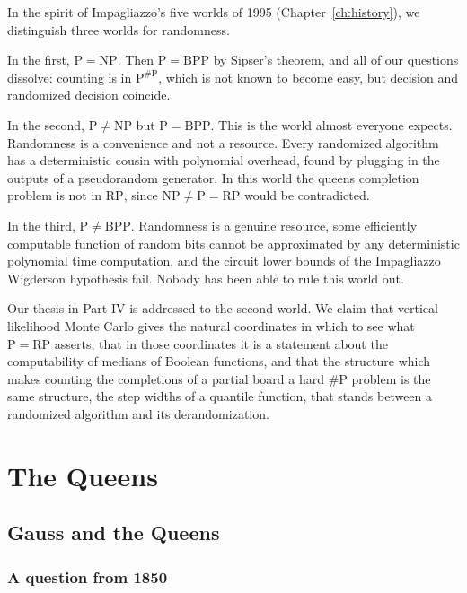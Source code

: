 \documentclass[11pt,twoside,openany]{book}
\theoremstyle{plain}
\theoremstyle{definition}
\theoremstyle{remark}
\newcommand{\RP}{\mathrm{RP}}
\newcommand{\BPP}{\mathrm{BPP}}
\newcommand{\NP}{\mathrm{NP}}
\newcommand{\Pc}{\mathrm{P}}
\newcommand{\sharpP}{\#\mathrm{P}}
\begin{document}
In the spirit of Impagliazzo's five worlds of 1995 (Chapter~\ref{ch:history}), we distinguish three worlds for randomness.

In the first, $\Pc = \NP$. Then $\Pc = \BPP$ by Sipser's theorem, and all of our questions dissolve: counting is in $\Pc^{\sharpP}$, which is not known to become easy, but decision and randomized decision coincide.

In the second, $\Pc \neq \NP$ but $\Pc = \BPP$. This is the world almost everyone expects. Randomness is a convenience and not a resource. Every randomized algorithm has a deterministic cousin with polynomial overhead, found by plugging in the outputs of a pseudorandom generator. In this world the queens completion problem is not in $\RP$, since $\NP \neq \Pc = \RP$ would be contradicted.

In the third, $\Pc \neq \BPP$. Randomness is a genuine resource, some efficiently computable function of random bits cannot be approximated by any deterministic polynomial time computation, and the circuit lower bounds of the Impagliazzo Wigderson hypothesis fail. Nobody has been able to rule this world out.

Our thesis in Part IV is addressed to the second world. We claim that vertical likelihood Monte Carlo gives the natural coordinates in which to see what $\Pc = \RP$ asserts, that in those coordinates it is a statement about the computability of medians of Boolean functions, and that the structure which makes counting the completions of a partial board a hard $\sharpP$ problem is the same structure, the step widths of a quantile function, that stands between a randomized algorithm and its derandomization.





\part{The Queens}

\chapter{Gauss and the Queens}
\label{ch:gauss}

\section{A question from 1850}
\end{document}

